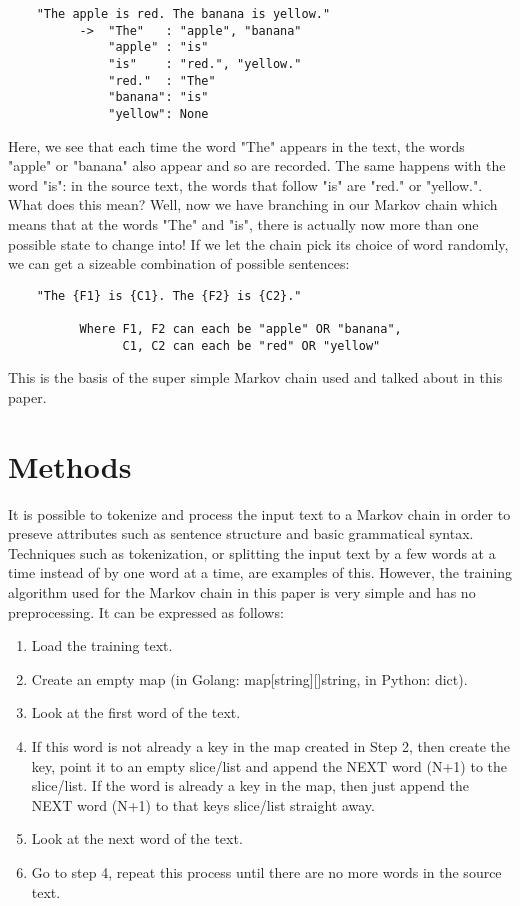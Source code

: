 \documentclass[11pt, a4paper]{article}
\begin{document}
  \begin{lstlisting}
    "The apple is red. The banana is yellow."
          ->  "The"   : "apple", "banana"
              "apple" : "is"
              "is"    : "red.", "yellow."
              "red."  : "The"
              "banana": "is"
              "yellow": None
  \end{lstlisting}

  Here, we see that each time the word "The" appears in the text, the words "apple" or "banana" also appear and so are recorded. The same happens with the word "is": in the source text, the words that follow "is" are "red." or "yellow.". What does this mean? Well, now we have branching in our Markov chain which means that at the words "The" and "is", there is actually now more than one possible state to change into! If we let the chain pick its choice of word randomly, we can get a sizeable combination of possible sentences: \newline

  \begin{lstlisting}
    "The {F1} is {C1}. The {F2} is {C2}."

          Where F1, F2 can each be "apple" OR "banana",
                C1, C2 can each be "red" OR "yellow"
  \end{lstlisting}

  This is the basis of the super simple Markov chain used and talked about in this paper.

  \section{Methods}
  It is possible to tokenize and process the input text to a Markov chain in order to preseve attributes such as sentence structure and basic grammatical syntax. Techniques such as tokenization, or splitting the input text by a few words at a time instead of by one word at a time, are examples of this. However, the training algorithm used for the Markov chain in this paper is very simple and has no preprocessing. It can be expressed as follows:\newline

  \begin{enumerate}
    \item Load the training text.
    \item Create an empty map (in Golang: map[string][]string, in Python: dict{}).
    \item Look at the first word of the text.
    \item If this word is not already a key in the map created in Step 2, then create the key, point it to an empty slice/list and append the NEXT word (N+1) to the slice/list. If the word is already a key in the map, then just append the NEXT word (N+1) to that keys slice/list straight away.
    \item Look at the next word of the text.
    \item Go to step 4, repeat this process until there are no more words in the source text. \newline
  \end{enumerate}
\end{document}
